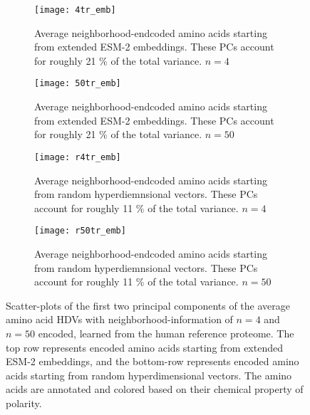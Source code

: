 \begin{figure}[H]
    \label{fig:bigfig}
    \centering
    \begin{subfigure}[b]{0.45\textwidth}
        \texttt{[image: 4tr\_emb]}
        \caption{Average neighborhood-endcoded amino acids starting from extended ESM-2 embeddings. These PCs account for roughly 21 \% of the total variance. $n = 4$}
        \label{fig:AAtr4}
    \end{subfigure}
    \hfill
    \begin{subfigure}[b]{0.45\textwidth}
        \texttt{[image: 50tr\_emb]}
        \caption{Average neighborhood-endcoded amino acids starting from extended ESM-2 embeddings. These PCs account for roughly 21 \% of the total variance. $n = 50$}
        \label{fig:AAtr50}
    \end{subfigure}
    \vspace{10pt} %
    \begin{subfigure}[b]{0.45\textwidth}
        \texttt{[image: r4tr\_emb]}
        \caption{Average neighborhood-endcoded amino acids starting from random hyperdiemnsional vectors. These PCs account for roughly 11 \% of the total variance.  $n = 4$}
        \label{fig:AArtr4}
    \end{subfigure}
    \hfill
    \begin{subfigure}[b]{0.45\textwidth}
        \texttt{[image: r50tr\_emb]}
        \caption{Average neighborhood-endcoded amino acids starting from random hyperdiemnsional vectors. These PCs account for roughly 11 \% of the total variance.  $n = 50$}
        \label{fig:AArtr50}
    \end{subfigure}
    \caption{Scatter-plots of the first two principal components of the average amino acid HDVs with neighborhood-information of $n = 4$ and $n = 50$ encoded, learned from the human reference proteome. The top row represents encoded amino acids starting from extended ESM-2 embeddings, and the bottom-row represents encoded amino acids starting from random hyperdimensional vectors. The amino acids are annotated and colored based on their chemical property of polarity.}
\end{figure}

